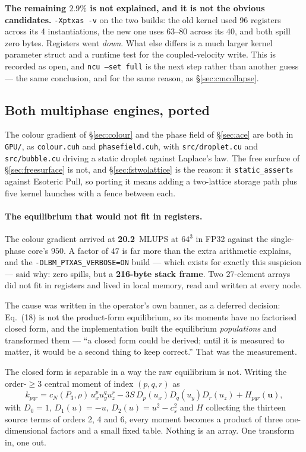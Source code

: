 \documentclass[11pt,a4paper]{article}
\newcommand{\code}[1]{\texttt{\small #1}}
\newcommand{\cs}{c_s}
\newcommand{\uu}{\bm{u}}
\begin{document}
\textbf{The remaining $2.9\%$ is not explained, and it is not the obvious
candidates.} \code{-Xptxas -v} on the two builds: the old kernel used 96
registers across its 4 instantiations, the new one uses 63--80 across its 40, and
both spill zero bytes. Registers went \emph{down}. What else differs is a much
larger kernel parameter struct and a runtime test for the coupled-velocity write.
This is recorded as open, and \code{ncu --set full} is the next step rather than
another guess --- the same conclusion, and for the same reason, as
\S\ref{sec:cmcollapse}.

\subsection{Both multiphase engines, ported}
\label{sec:cudamp}

The colour gradient of \S\ref{sec:colour} and the phase field of
\S\ref{sec:ace} are both in \code{GPU/}, as \code{colour.cuh} and
\code{phasefield.cuh}, with \code{src/droplet.cu} and \code{src/bubble.cu}
driving a static droplet against Laplace's law. The free surface of
\S\ref{sec:freesurface} is not, and \S\ref{sec:fstwolattice} is the reason:
it \code{static\_assert}s against Esoteric Pull, so porting it means adding a
two-lattice storage path plus five kernel launches with a fence between each.

\paragraph{The equilibrium that would not fit in registers.} The colour gradient
arrived at \textbf{20.2}~MLUPS at $64^3$ in FP32 against the single-phase core's
$950$. A factor of $47$ is far more than the extra arithmetic explains, and the
\code{-DLBM\_PTXAS\_VERBOSE=ON} build --- which exists for exactly this suspicion
--- said why: zero spills, but a \textbf{216-byte stack frame}. Two 27-element
arrays did not fit in registers and lived in local memory, read and written at
every node.

The cause was written in the operator's own banner, as a deferred decision:
Eq.~(18) is not the product-form equilibrium, so its moments have no factorised
closed form, and the implementation built the equilibrium \emph{populations} and
transformed them --- ``a closed form could be derived; until it is measured to
matter, it would be a second thing to keep correct.'' That was the measurement.

The closed form is separable in a way the raw equilibrium is not. Writing the
order-$\ge 3$ central moment of index $(p,q,r)$ as
\begin{equation}
  k_{pqr} = c_N(P_3,\rho)\, u_x^{p} u_y^{q} u_z^{r}
          - 3S\, D_p(u_x) D_q(u_y) D_r(u_z)
          + H_{pqr}(\uu),
\end{equation}
with $D_0 = 1$, $D_1(u) = -u$, $D_2(u) = u^2 - \cs^2$ and $H$ collecting the
thirteen source terms of orders 2, 4 and 6, every moment becomes a product of
three one-dimensional factors and a small fixed table. Nothing is an array. One
transform in, one out.
\end{document}
